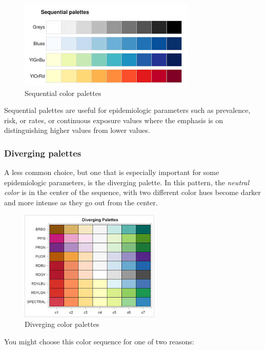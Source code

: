 \documentclass[
]{book}
\newenvironment{rmdnote}[1]
  {
  \begin{itemize}
  \renewcommand{\labelitemi}{
    \raisebox{-.7\height}[0pt][0pt]{
      {\setkeys{Gin}{width=3em,keepaspectratio}\texttt{[image: images/\#1]}}
    }
  }
  \setlength{\fboxsep}{1em}
  \begin{note}
  \item
  }
  {
  \end{note}
  \end{itemize}
  }
\begin{document}
\begin{figure}
\centering
\includegraphics{images/palette-sequential.png}
\caption{\label{fig:unnamed-chunk-3}Sequential color palettes}
\end{figure}

\begin{rmdnote}{note}
Sequential palettes are useful for epidemiologic parameters such as prevalence, risk, or rates, or continuous exposure values where the emphasis is on distinguishing higher values from lower values.

\end{rmdnote}

\hypertarget{diverging-palettes}{%
\subsubsection{Diverging palettes}\label{diverging-palettes}}

A less common choice, but one that is especially important for some epidemiologic parameters, is the diverging palette. In this pattern, the \emph{neutral color} is in the center of the sequence, with two different color hues become darker and more intense as they go out from the center.

\begin{figure}
\centering
\includegraphics{images/palette-diverging.png}
\caption{\label{fig:unnamed-chunk-4}Diverging color palettes}
\end{figure}

You might choose this color sequence for one of two reasons:
\end{document}
